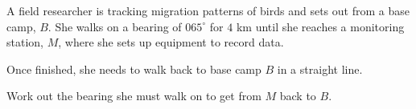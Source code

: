 \begin{question}
\noindent A field researcher is tracking migration patterns of birds and sets out from a base camp, $B$. She walks on a bearing of $065^\circ$ for $4$ km until she reaches a monitoring station, $M$, where she sets up equipment to record data.

Once finished, she needs to walk back to base camp $B$ in a straight line.

\noindent Work out the bearing she must walk on to get from $M$ back to $B$.

\vspace{4cm}

\begin{flushright}
\end{flushright}
\end{question}